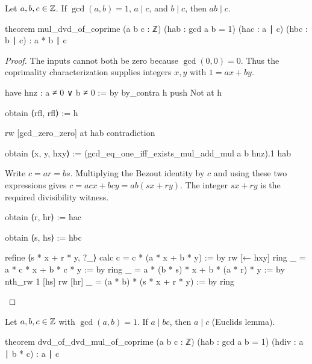 \begin{corollary}
  \label{ent:thm:coprime-product-divides}
  Let $a,b,c\in\mathbb{Z}$.
  If $\gcd(a,b)=1$, $a\mid c$, and $b\mid c$, then $ab\mid c$.

  \begin{lean}
    theorem mul_dvd_of_coprime (a b c : ℤ) (hab : gcd a b = 1)
        (hac : a ∣ c) (hbc : b ∣ c) : a * b ∣ c
  \end{lean}
\end{corollary}

\begin{proof}
  The inputs cannot both be zero because $\gcd(0,0)=0$.
  Thus the coprimality characterization supplies integers $x,y$ with $1=ax+by$.

  \begin{lean}
    have hnz : a ≠ 0 ∨ b ≠ 0 := by
      by_contra h
      push Not at h

      obtain ⟨rfl, rfl⟩ := h

      rw [gcd_zero_zero] at hab
      contradiction

    obtain ⟨x, y, hxy⟩ := (gcd_eq_one_iff_exists_mul_add_mul a b hnz).1 hab
  \end{lean}
  Write $c=ar=bs$.
  Multiplying the Bezout identity by $c$ and using these two expressions gives
  $c=acx+bcy=ab(sx+ry)$.
  The integer $sx+ry$ is the required divisibility witness.

  \begin{lean}
    obtain ⟨r, hr⟩ := hac

    obtain ⟨s, hs⟩ := hbc

    refine ⟨s * x + r * y, ?_⟩
    calc
      c = c * (a * x + b * y) := by
        rw [← hxy]
        ring
      _ = a * c * x + b * c * y := by
        ring
      _ = a * (b * s) * x + b * (a * r) * y := by
        nth_rw 1 [hs]
        rw [hr]
      _ = (a * b) * (s * x + r * y) := by
        ring
  \end{lean}
\end{proof}

\begin{theorem}
  \label{ent:thm:euclid-lemma}
  Let $a,b,c\in\mathbb{Z}$ with $\gcd(a,b)=1$.
  If $a\mid bc$, then $a\mid c$ (Euclid\textquotesingle s lemma).

  \begin{lean}
    theorem dvd_of_dvd_mul_of_coprime (a b c : ℤ) (hab : gcd a b = 1)
        (hdiv : a ∣ b * c) : a ∣ c
  \end{lean}
\end{theorem}

